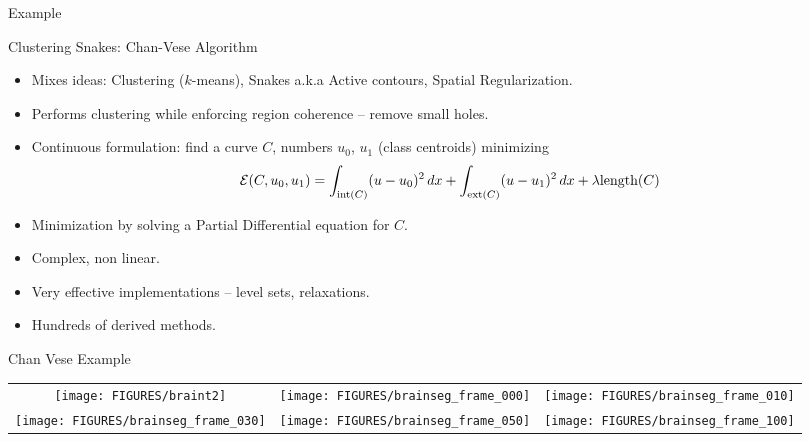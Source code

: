 \documentclass[9pt]{beamer}
\begin{document}
\begin{frame}[t]{Example}
  \vfill
  \begin{center}
  \end{center}\vfill
\end{frame}






\begin{frame}[t]{Clustering Snakes: Chan-Vese Algorithm}
  \begin{itemize}
  \item Mixes ideas: Clustering ($k$-means), Snakes a.k.a Active contours, Spatial Regularization.
  \item Performs clustering while enforcing region coherence -- remove small holes.\vfill
  \item Continuous formulation: find a curve $C$, numbers $u_0$, $u_1$ (class centroids)  minimizing
    $$
    {\mathcal E}(C,u_0,u_1) = \int_{\text{int}(C)}(u-u_0)^2\,dx + \int_{\text{ext}(C)}(u-u_1)^2\,dx +  \lambda\text{length}(C) 
    $$\vfill
  \item Minimization by solving a Partial Differential equation for $C$.\vfill
  \item Complex, non linear.\vfill
  \item Very effective implementations -- level sets, relaxations.\vfill
  \item Hundreds of derived methods.\vfill
  \end{itemize}
\end{frame}


\begin{frame}[t]{Chan Vese Example}
  \begin{center}
    \begin{tabular}[h]{ccc}
      \texttt{[image: FIGURES/braint2]} & 
      \texttt{[image: FIGURES/brainseg\_frame\_000]} &
      \texttt{[image: FIGURES/brainseg\_frame\_010]}\\
      \texttt{[image: FIGURES/brainseg\_frame\_030]} &
      \texttt{[image: FIGURES/brainseg\_frame\_050]} &
      \texttt{[image: FIGURES/brainseg\_frame\_100]}
    \end{tabular}
  \end{center}
\end{frame}
\end{document}
